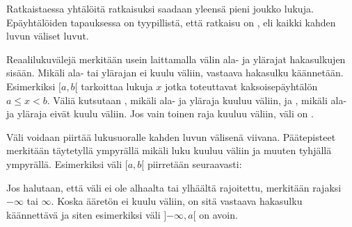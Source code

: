 Ratkaistaessa yhtälöitä ratkaisuksi saadaan yleensä pieni joukko lukuja. Epäyhtälöiden tapauksessa on tyypillistä, että ratkaisu on , eli kaikki kahden luvun väliset luvut.

Reaalilukuvälejä merkitään usein laittamalla välin ala- ja ylärajat hakasulkujen sisään. Mikäli ala- tai ylärajan ei kuulu väliin, vastaava hakasulku käännetään. Esimerkiksi $[a, b[$ tarkoittaa lukuja $x$ jotka toteuttavat kaksoisepäyhtälön $a \leq x < b$. Väliä kutsutaan , mikäli ala- ja yläraja kuuluu väliin, ja , mikäli ala- ja yläraja eivät kuulu väliin. Jos vain toinen raja kuuluu väliin, väli on .

Väli voidaan piirtää lukusuoralle kahden luvun välisenä viivana. Päätepisteet merkitään täytetyllä ympyrällä mikäli luku kuuluu väliin ja muuten tyhjällä ympyrällä. Esimerkiksi väli $[a, b[$ piirretään seuraavasti:

\begin{lukusuora}{0}{10}{6}
\end{lukusuora}

Jos halutaan, että väli ei ole alhaalta tai ylhäältä rajoitettu, merkitään rajaksi $-\infty$ tai $\infty$. Koska ääretön ei kuulu väliin, on sitä vastaava hakasulku käännettävä ja siten esimerkiksi väli $]{-\infty}, a[$ on avoin. 


% 

